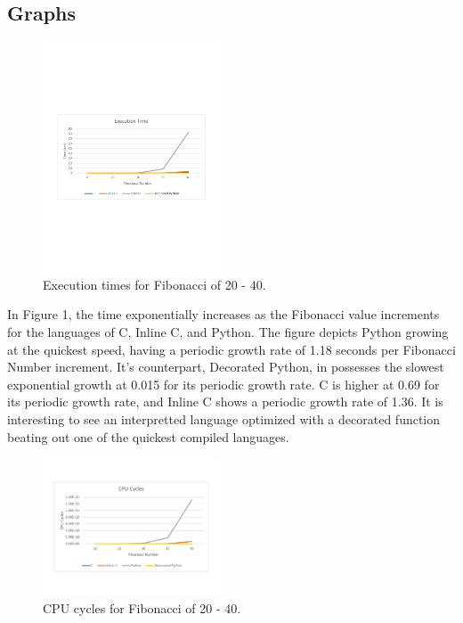 \documentclass{sig-alternate}
\begin{document}
\subsection{Graphs}
\begin{figure}[ht]
	\centering
		\includegraphics[width=0.47\textwidth] {ExeTime.pdf}
	\caption{Execution times for Fibonacci of 20 - 40.}
	\label{Exe Times}
\end{figure}

In Figure 1, the time exponentially increases as the Fibonacci value increments for the languages of C, Inline C, and Python. The figure depicts Python growing at the quickest speed, having a periodic growth rate of 1.18 seconds per Fibonacci Number increment. It's counterpart, Decorated Python, in possesses the slowest exponential growth at 0.015 for its periodic growth rate. C is higher at 0.69 for its periodic growth rate, and Inline C shows a periodic growth rate of 1.36. It is interesting to see an interpretted language optimized with a decorated function beating out one of the quickest compiled languages.

\begin{figure}[ht]
	\centering
		\includegraphics[width=0.47\textwidth] {CPUcycles.pdf}
	\caption{CPU cycles for Fibonacci of 20 - 40.}
	\label{CPU Cycles}
\end{figure}
\end{document}
